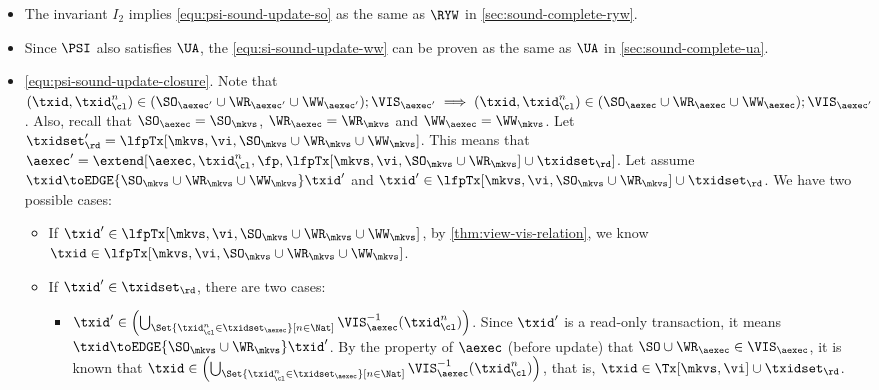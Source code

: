 \begin{itemize}
\item The invariant \( I_2 \) implies \cref{equ:psi-sound-update-so} as the same as \( \RYW \) in \cref{sec:sound-complete-ryw}.
\item Since \( \PSI \) also satisfies \( \UA \), the \cref{equ:si-sound-update-ww} can be proven as the same as \( \UA \) in \cref{sec:sound-complete-ua}.
\item \cref{equ:psi-sound-update-closure}.
    Note that \( (\txid, \txid_\cl^n) \in ( \SO_{\aexec'} \cup \WR_{\aexec'} \cup \WW_{\aexec'}); \VIS_{\aexec'} \implies (\txid, \txid_\cl^n) \in ( \SO_{\aexec} \cup \WR_{\aexec}  \cup \WW_{\aexec} ) ; \VIS_{\aexec'}\).
    Also, recall that \( \SO_\aexec = \SO_\mkvs \), \( \WR_\aexec = \WR_\mkvs \) and  \( \WW_\aexec = \WW_\mkvs \).
    Let \( \txidset'_\rd = \lfpTx[\mkvs,\vi,\SO_{\mkvs} \cup \WR_{\mkvs} \cup \WW_{\mkvs}] \). 
    This means that \( \aexec' = \extend[\aexec, \txid_\cl^n, \fp, \lfpTx[\mkvs, \vi, \SO_{\mkvs} \cup \WR_{\mkvs}] \cup \txidset_\rd ] \).
    Let assume \( \txid \toEDGE{\SO_{\mkvs} \cup \WR_{\mkvs} \cup \WW_{\mkvs}} \txid' \) and \( \txid' \in \lfpTx[\mkvs, \vi, \SO_{\mkvs} \cup \WR_{\mkvs}] \cup \txidset_\rd \).
    We have two possible cases:
    \begin{itemize}
        \item If \( \txid' \in \lfpTx[\mkvs, \vi, \SO_{\mkvs} \cup \WR_{\mkvs} \cup \WW_{\mkvs}] \), by  \cref{thm:view-vis-relation}, we know \( \txid \in \lfpTx[\mkvs, \vi, \SO_{\mkvs} \cup \WR_{\mkvs} \cup \WW_{\mkvs}] \).
        \item If \( \txid' \in \txidset_\rd \), there are two cases:
        \begin{itemize}
            \item \( \txid' \in  \left( \bigcup_{\Set{\txid_{\cl}^{n} \in \txidset_{\aexec} }[ n \in \Nat ]} \VIS_{\aexec}^{-1}(\txid^n_\cl) \right) \).
                Since \( \txid' \) is a read-only transaction, it means \( \txid \toEDGE{\SO_{\mkvs} \cup \WR_{\mkvs} } \txid' \).
                By the property of \( \aexec \) (before update) that \( \SO \cup \WR_\aexec \in \VIS_\aexec \), it is known that \( \txid \in \left( \bigcup_{\Set{\txid_{\cl}^{n} \in \txidset_{\aexec} }[ n \in \Nat ]} \VIS_{\aexec}^{-1}(\txid^n_\cl) \right) \), that is, \( \txid \in \Tx[\mkvs,\vi] \cup \txidset_\rd\).


\end{itemize}
\end{itemize}
\end{itemize}

